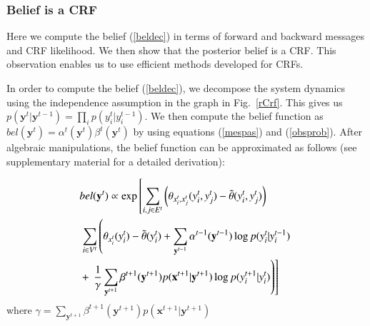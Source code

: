 \subsubsection{Belief is a CRF}
\label{beliscrf}
Here we compute the belief (\ref{beldec}) in terms of forward and backward messages and CRF likelihood. We then show that the posterior belief is a CRF. This observation enables us to use efficient methods developed for CRFs.

In order to compute the belief (\ref{beldec}), we decompose
the system dynamics using the independence assumption in the graph in Fig.~\ref{rCrf}.
This gives us \mbox{$p(\mathbf{y}^t|\mathbf{y}^{t-1})=\prod_{i} p(y^t_i|y^{t-1}_i)$}.
%
%
We then compute the belief function as \mbox{$bel(\mathbf{y}^t)=\alpha^t(\mathbf{y}^t)\beta^t(\mathbf{y}^t)$} by using equations (\ref{mespas}) and (\ref{obsprob}). After algebraic manipulations, the belief function can be approximated as follows (see supplementary material for a detailed derivation):
\iffalse
\begin{equation}\small
	\begin{aligned}
&bel(\mathbf{y}^t) \propto \exp\left[  \sum_{i,j \in E^t} \left( \theta_{x^t_i,x^t_j}(y^t_i,y^t_j) - \tilde{\theta}(y^t_i,y^t_j) \right) \right. \\
&\left. \sum_{i \in V^t} \left( \theta_{x^t_i}(y^t_i) - \tilde{\theta}(y^t_i) +  \sum_{\mathbf{y^{t-1}}} \alpha^{t-1}(\mathbf{y}^{t-1}) \log p(y^t_i|y^{t-1}_i) \right. \right. \\
&+\left.\left.\sum_{\mathbf{y}^{t+1}} \beta^{t+1}(\mathbf{y}^{t+1}) p(\mathbf{x}^{t+1}|\mathbf{y}^{t+1}) \log p(y^t_i|y^{t-1}_i) \right) \right]
\end{aligned}
\label{crfbelief}
\end{equation}
\fi

\begin{equation}\small
  \begin{aligned}
&bel(\mathbf{y}^t) \propto \exp\left[  \sum_{i,j \in E^t} \left( \theta_{x^t_i,x^t_j}(y^t_i,y^t_j) - \tilde{\theta}(y^t_i,y^t_j) \right) \right. \\
&\left. \sum_{i \in V^t} \left( \theta_{x^t_i}(y^t_i) - \tilde{\theta}(y^t_i) +  \sum_{\mathbf{y}^{t-1}} \alpha^{t-1}(\mathbf{y}^{t-1}) \log p(y^t_i|y^{t-1}_i) \right. \right. \\
&+\left.\left.\frac{1}{\gamma}\sum_{\mathbf{y}^{t+1}} \beta^{t+1}(\mathbf{y}^{t+1}) p(\mathbf{x}^{t+1}|\mathbf{y}^{t+1}) \log p(y^{t+1}_i|y^{t}_i) \right) \right]
\end{aligned}
\label{crfbelief}
\end{equation}
where $\gamma=\sum_{\mathbf{y}^{t+1}} \beta^{t+1}(\mathbf{y}^{t+1}) p(\mathbf{x}^{t+1}|\mathbf{y}^{t+1})$

